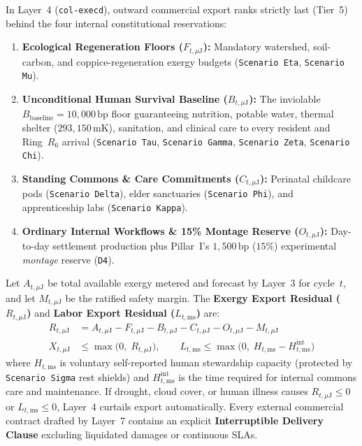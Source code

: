 In Layer~4 (\texttt{col-execd}), outward commercial export ranks strictly last (Tier~5) behind the four internal constitutional reservations:
\begin{enumerate}
    \item \textbf{Ecological Regeneration Floors ($F_{t,\mu\mathrm{J}}$):} Mandatory watershed, soil-carbon, and coppice-regeneration exergy budgets (\texttt{Scenario Eta}, \texttt{Scenario Mu}).
    \item \textbf{Unconditional Human Survival Baseline ($B_{t,\mu\mathrm{J}}$):} The inviolable $B_{\mathrm{baseline}} = 10{,}000\,\mathrm{bp}$ floor guaranteeing nutrition, potable water, thermal shelter ($293{,}150\,\mathrm{mK}$), sanitation, and clinical care to every resident and Ring~$R_6$ arrival (\texttt{Scenario Tau}, \texttt{Scenario Gamma}, \texttt{Scenario Zeta}, \texttt{Scenario Chi}).
    \item \textbf{Standing Commons \& Care Commitments ($C_{t,\mu\mathrm{J}}$):} Perinatal childcare pods (\texttt{Scenario Delta}), elder sanctuaries (\texttt{Scenario Phi}), and apprenticeship labs (\texttt{Scenario Kappa}).
    \item \textbf{Ordinary Internal Workflows \& 15\% Montage Reserve ($O_{t,\mu\mathrm{J}}$):} Day-to-day settlement production plus Pillar~I's $1{,}500\,\mathrm{bp}$ ($15\%$) experimental \textit{montage} reserve (\texttt{D4}).
\end{enumerate}

Let $A_{t,\mu\mathrm{J}}$ be total available exergy metered and forecast by Layer~3 for cycle~$t$, and let $M_{t,\mu\mathrm{J}}$ be the ratified safety margin. The \textbf{Exergy Export Residual ($R_{t,\mu\mathrm{J}}$)} and \textbf{Labor Export Residual ($L_{t,\mathrm{ms}}$)} are:
\begin{align}
R_{t,\mu\mathrm{J}} &= A_{t,\mu\mathrm{J}} - F_{t,\mu\mathrm{J}} - B_{t,\mu\mathrm{J}} - C_{t,\mu\mathrm{J}} - O_{t,\mu\mathrm{J}} - M_{t,\mu\mathrm{J}} \label{eq:ch8-exergy-residual} \\
X_{t,\mu\mathrm{J}} &\le \max\bigl(0,\; R_{t,\mu\mathrm{J}}\bigr), \qquad L_{t,\mathrm{ms}} \le \max\bigl(0,\; H_{t,\mathrm{ms}} - H^{\mathrm{int}}_{t,\mathrm{ms}}\bigr) \label{eq:ch8-export-bounds}
\end{align}
where $H_{t,\mathrm{ms}}$ is voluntary self-reported human stewardship capacity (protected by \texttt{Scenario Sigma} rest shields) and $H^{\mathrm{int}}_{t,\mathrm{ms}}$ is the time required for internal commons care and maintenance. If drought, cloud cover, or human illness causes $R_{t,\mu\mathrm{J}} \le 0$ or $L_{t,\mathrm{ms}} \le 0$, Layer~4 curtails export automatically. Every external commercial contract drafted by Layer~7 contains an explicit \textbf{Interruptible Delivery Clause} excluding liquidated damages or continuous SLAs.

